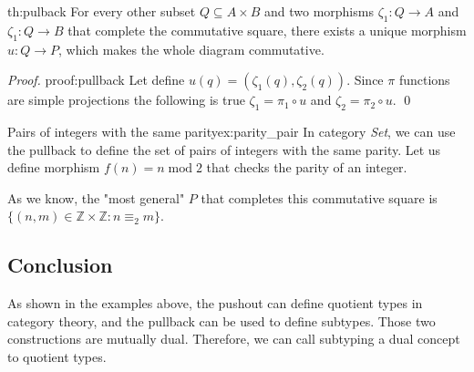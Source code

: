 \begin{theo}{}{th:pulback}
For every other subset $Q \subseteq A \times B$ and two morphisms $\zeta_1: Q \rightarrow A$ and $\zeta_1: Q \rightarrow B$ that complete the commutative square, there exists a unique morphism $u: Q \rightarrow P$, which makes the whole diagram commutative.
\end{theo}
\begin{proof}{}{proof:pullback}
Let define $u(q) = (\zeta_1(q), \zeta_2(q))$. Since $\pi$ functions are simple projections the following is true $\zeta_1 = \pi_1 \circ u$ and $\zeta_2 = \pi_2 \circ u$. \qed
\end{proof}
\begin{example}{Pairs of integers with the same parity}{ex:parity_pair}
In category \emph{Set}, we can use the pullback to define the set of pairs of integers with the same parity. Let us define morphism $f(n) = n \; \textrm{mod} \; 2$ that checks the parity of an integer.
\begin{center}
\end{center}
As we know, the "most general" $P$ that completes this commutative square is $\{(n, m) \in \mathbb{Z} \times \mathbb{Z} : n \equiv_2 m\}$.
\end{example}
\subsection{Conclusion}
As shown in the examples above, the pushout can define quotient types in category theory, and the pullback can be used to define subtypes.  Those two constructions are mutually dual. Therefore, we can call subtyping a dual concept to quotient types.
